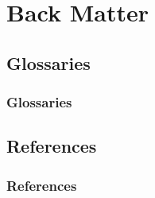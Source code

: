 \documentclass{beamer}
\begin{document}
\section{Back Matter}
\subsection{Glossaries}
\begin{frame}[allowframebreaks]
\frametitle{Glossaries}
\printglossaries
\end{frame}
\subsection{References}
\begin{frame}[allowframebreaks]%
\frametitle{References}
{\footnotesize
	 \printbibliography
}
\end{frame}

\end{document}
